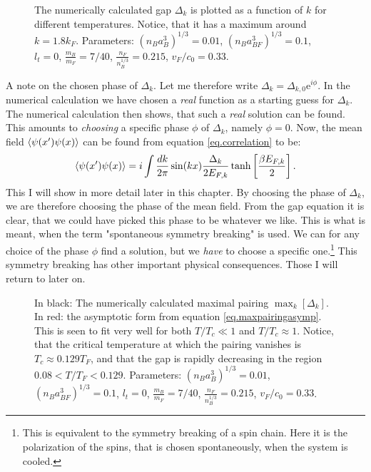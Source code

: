 \begin{figure} 
\begin{center}  
  
\caption{The numerically calculated gap $\Delta_k$ is plotted as a function of $k$ for different temperatures. Notice, that it has a maximum around $k = 1.8 k_F$. Parameters: $(n_Ba_B^3)^{1/3} = 0.01$, $(n_Ba_{BF}^3)^{1/3} = 0.1$, $l_t = 0$, $\frac{m_B}{m_F} = 7/40$, $\frac{n_F}{n_B^{1/3}} = 0.215$, $v_F/c_0 = 0.33$. }  
\label{fig.Deltakkdepend}  
\end{center}    
\end{figure}

A note on the chosen phase of $\Delta_k$. Let me therefore write $\Delta_k = \Delta_{k,0}\text{e}^{i\phi}$. In the numerical calculation we have chosen a \textit{real} function as a starting guess for $\Delta_k$. The numerical calculation then shows, that such a \textit{real} solution can be found. This amounts to \textit{choosing} a specific phase $\phi$ of $\Delta_k$, namely $\phi = 0$. Now, the mean field $\braket{\psi(x')\psi(x)}$ can be found from equation \ref{eq.correlation} to be:
\begin{equation}
\braket{\psi(x')\psi(x)} = i\int \frac{dk}{2\pi} \sin(kx)\frac{\Delta_k}{2E_{F,k}}\tanh\left[\frac{ \beta E_{F,k} }{2}\right]. \nonumber
\end{equation}
This I will show in more detail later in this chapter. By choosing the phase of $\Delta_k$, we are therefore choosing the phase of the mean field. From the gap equation it is clear, that we could have picked this phase to be whatever we like. This is what is meant, when the term "spontaneous symmetry breaking" is used. We can for any choice of the phase $\phi$ find a solution, but we \textit{have} to choose a specific one.\footnote{This is equivalent to the symmetry breaking of a spin chain. Here it is the polarization of the spins, that is chosen spontaneously, when the system is cooled.} This symmetry breaking has other important physical consequences. Those I will return to later on. 

\begin{figure} 
\begin{center}  
  
\caption{In black: The numerically calculated maximal pairing $\max_k[\Delta_k]$. In red: the asymptotic form from equation \eqref{eq.maxpairingasymp}. This is seen to fit very well for both $T/T_c \ll 1$ and $T/T_c \approx 1$. Notice, that the critical temperature at which the pairing vanishes is $T_c \approx 0.129 T_F$, and that the gap is rapidly decreasing in the region $0.08< T/T_F < 0.129$. Parameters: $(n_Ba_B^3)^{1/3} = 0.01$, $(n_Ba_{BF}^3)^{1/3} = 0.1$, $l_t = 0$, $\frac{m_B}{m_F} = 7/40$, $\frac{n_F}{n_B^{1/3}} = 0.215$, $v_F/c_0 = 0.33$. }  
\label{fig.maxkDeltakTdepend}  
\end{center}    
\end{figure}


